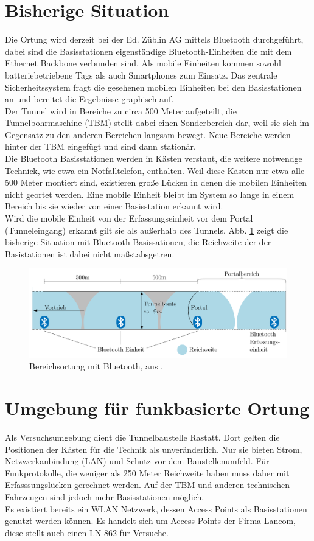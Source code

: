 \section{Bisherige Situation}
Die Ortung wird derzeit bei der Ed. Züblin AG mittels Bluetooth durchgeführt, dabei sind die Basisstationen eigenständige Bluetooth-Einheiten die mit dem Ethernet Backbone verbunden sind.
Als mobile Einheiten kommen sowohl batteriebetriebene Tags als auch Smartphones zum Einsatz. 
Das zentrale Sicherheitssystem fragt die gesehenen mobilen Einheiten bei den Basisstationen an und bereitet die Ergebnisse graphisch auf.\\
Der Tunnel wird in Bereiche zu circa 500 Meter aufgeteilt, die Tunnelbohrmaschine (TBM) stellt dabei einen Sonderbereich dar, weil sie sich im Gegensatz zu den anderen Bereichen langsam bewegt. 
Neue Bereiche werden hinter der TBM eingefügt und sind dann stationär.\\
Die Bluetooth Basisstationen werden in Kästen verstaut, die weitere notwendge Technick, wie etwa ein Notfalltelefon, enthalten.
Weil diese Kästen nur etwa alle 500 Meter montiert sind, existieren große Lücken in denen die mobilen Einheiten nicht geortet werden.
Eine mobile Einheit bleibt im System so lange in einem Bereich bis sie wieder von einer Basisstation erkannt wird.\\
Wird die mobile Einheit von der Erfassungseinheit vor dem Portal (Tunneleingang) erkannt gilt sie als außerhalb des Tunnels.
Abb. \ref{fig:bisherige} zeigt die bisherige Situation mit Bluetooth Basissationen, die Reichweite der der Basistationen ist dabei nicht maßstabsgetreu.

\begin{figure}[h]
  \centering
	\includegraphics[width=\textwidth]{images/bisherige.png}
  \caption{Bereichsortung mit Bluetooth, aus \cite{maurer2016unterstuetzung}.}
  \label{fig:bisherige}
\end{figure}

 
\section{Umgebung für funkbasierte Ortung}
Als Versuchsumgebung dient die Tunnelbaustelle Rastatt.
Dort gelten die Positionen der Kästen für die Technik als  unveränderlich.
Nur sie bieten Strom, Netzwerkanbindung (LAN) und Schutz vor dem Baustellenumfeld.
Für Funkprotokolle, die weniger als 250 Meter Reichweite haben muss daher mit Erfasssungslücken gerechnet werden.
Auf der TBM und anderen technischen Fahrzeugen sind jedoch mehr Basisstationen möglich.\\
Es existiert bereits ein WLAN Netzwerk, dessen Access Points als Basisstationen genutzt werden können.
Es handelt sich um Access Points der Firma Lancom, diese stellt auch einen LN-862 für Versuche.

